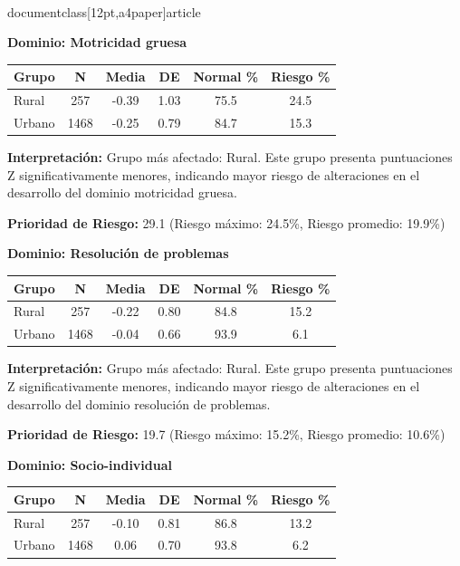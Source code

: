 \\documentclass[12pt,a4paper]{article}
\begin{document}
\textbf{Dominio: Motricidad gruesa}


\begin{center}
\begin{tabular}{|l|c|c|c|c|c|}
\hline
\textbf{Grupo} & \textbf{N} & \textbf{Media} & \textbf{DE} & \textbf{Normal \%} & \textbf{Riesgo \%} \\
\hline
Rural & 257 & -0.39 & 1.03 & 75.5 & 24.5 \\
Urbano & 1468 & -0.25 & 0.79 & 84.7 & 15.3 \\

\hline
\end{tabular}
\end{center}


\textbf{Interpretación:} Grupo más afectado: Rural. Este grupo presenta puntuaciones Z significativamente menores, indicando mayor riesgo de alteraciones en el desarrollo del dominio motricidad gruesa.

\textbf{Prioridad de Riesgo:} 29.1 (Riesgo máximo: 24.5\%, Riesgo promedio: 19.9\%)


\vspace{0.5cm}


\textbf{Dominio: Resolución de problemas}


\begin{center}
\begin{tabular}{|l|c|c|c|c|c|}
\hline
\textbf{Grupo} & \textbf{N} & \textbf{Media} & \textbf{DE} & \textbf{Normal \%} & \textbf{Riesgo \%} \\
\hline
Rural & 257 & -0.22 & 0.80 & 84.8 & 15.2 \\
Urbano & 1468 & -0.04 & 0.66 & 93.9 & 6.1 \\

\hline
\end{tabular}
\end{center}


\textbf{Interpretación:} Grupo más afectado: Rural. Este grupo presenta puntuaciones Z significativamente menores, indicando mayor riesgo de alteraciones en el desarrollo del dominio resolución de problemas.

\textbf{Prioridad de Riesgo:} 19.7 (Riesgo máximo: 15.2\%, Riesgo promedio: 10.6\%)


\vspace{0.5cm}


\textbf{Dominio: Socio-individual}


\begin{center}
\begin{tabular}{|l|c|c|c|c|c|}
\hline
\textbf{Grupo} & \textbf{N} & \textbf{Media} & \textbf{DE} & \textbf{Normal \%} & \textbf{Riesgo \%} \\
\hline
Rural & 257 & -0.10 & 0.81 & 86.8 & 13.2 \\
Urbano & 1468 & 0.06 & 0.70 & 93.8 & 6.2 \\

\hline
\end{tabular}
\end{center}
\end{document}
